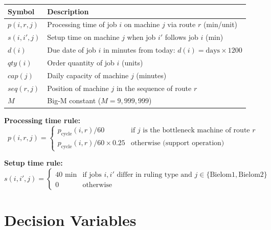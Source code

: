 \documentclass[11pt,a4paper]{article}
\begin{document}
\begin{tabularx}{\linewidth}{>{\bfseries}l X}
  \toprule
  \rowcolor{lightblue}
  Symbol & Description \\
  \midrule
  $p(i,r,j)$ & Processing time of job $i$ on machine $j$ via route $r$ (min/unit) \\
  \rowcolor{rowgray}
  $s(i,i',j)$ & Setup time on machine $j$ when job $i'$ follows job $i$ (min) \\
  $d(i)$      & Due date of job $i$ in minutes from today: $d(i) = \text{days} \times 1200$ \\
  \rowcolor{rowgray}
  $\mathit{qty}(i)$ & Order quantity of job $i$ (units) \\
  $\mathit{cap}(j)$ & Daily capacity of machine $j$ (minutes) \\
  \rowcolor{rowgray}
  $\mathit{seq}(r,j)$ & Position of machine $j$ in the sequence of route $r$ \\
  $M$         & Big-M constant ($M = 9{,}999{,}999$) \\
  \bottomrule
\end{tabularx}

\vspace{4pt}
\textbf{Processing time rule:}
\begin{equation*}
  p(i,r,j) =
  \begin{cases}
    p_{\text{cycle}}(i,r) / 60 & \text{if } j \text{ is the bottleneck machine of route } r \\
    p_{\text{cycle}}(i,r) / 60 \times 0.25 & \text{otherwise (support operation)}
  \end{cases}
\end{equation*}

\textbf{Setup time rule:}
\begin{equation*}
  s(i,i',j) =
  \begin{cases}
    40 \text{ min} & \text{if jobs } i,i' \text{ differ in ruling type and } j \in \{\text{Bielom1},\text{Bielom2}\} \\
    0              & \text{otherwise}
  \end{cases}
\end{equation*}

\section{Decision Variables}
\end{document}
